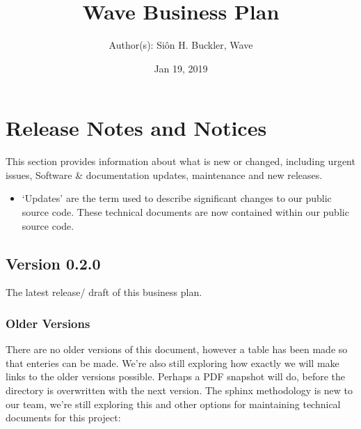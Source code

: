 \documentclass[letterpaper,10pt,openany,oneside,english]{sphinxmanual}
\title{Wave Business Plan}
\date{Jan 19, 2019}
\author{Author(s): Siôn H. Buckler, Wave}
\begin{document}
\maketitle
\sphinxtableofcontents
{}\label{\detokenize{index::doc}}


\noindent{}


\chapter{Release Notes and Notices}
\label{\detokenize{releasenotes:release-notes-and-notices}}\label{\detokenize{releasenotes::doc}}
This section provides information about what is new or changed, including urgent issues, Software \& documentation updates, maintenance and new releases.
\begin{itemize}
\item {} 
‘Updates’ are the term used to describe significant changes to our public source code. These technical documents are now contained within our public source code.

\end{itemize}


\section{Version 0.2.0}
\label{\detokenize{releasenotes:version-0-2-0}}
The latest release/ draft of this business plan.


\subsection{Older Versions}
\label{\detokenize{releasenotes:older-versions}}
There are no older versions of this document, however a table has been made so that enteries can be made. We’re also still exploring how exactly we will make links to the older versions possible. Perhaps a PDF snapshot will do, before the directory is overwritten with the next version. The sphinx methodology is new to our team, we’re still exploring this and other options for maintaining technical documents for this project:
\end{document}
